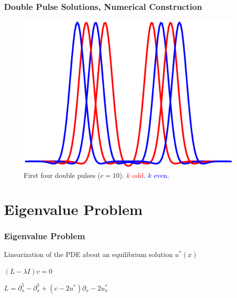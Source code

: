 \documentclass[16pt]{beamer}
\begin{document}
\begin{frame}
	\frametitle{Double Pulse Solutions, Numerical Construction}
	\fontsize{16}{7.2}\selectfont
	\begin{figure}
	\begin{center}
	\includegraphics[width=0.7\linewidth]{images/first4dp}
	\end{center}
	\caption{First four double pulses ($c = 10$). \textcolor{red}{$k$ odd}. \textcolor{blue}{$k$ even. } }
	\end{figure}
\end{frame}

\section{Eigenvalue Problem}

\begin{frame}
	\frametitle{Eigenvalue Problem}
	\fontsize{16}{7.2}\selectfont
	Linearization of the PDE about an equilibrium solution $u^*(x)$

	\begin{center}
		$(L - \lambda I )v = 0$
	\end{center}

	\begin{center}
		$L = \partial_x^5 - \partial_x^3 + (c - 2 u^*)\partial_x - 2 u^*_x $
	\end{center}
\end{frame}
\end{document}
